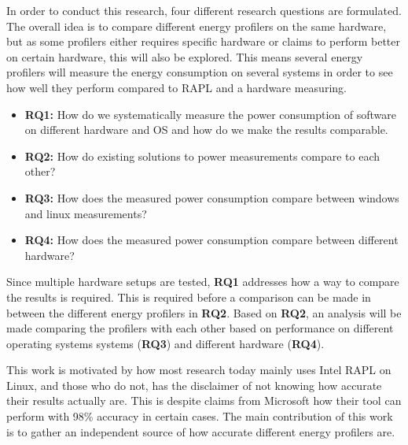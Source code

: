 In order to conduct this research, four different research questions are formulated. The overall idea is to compare different energy profilers on the same hardware, but as some profilers either requires specific hardware or claims to perform better on certain hardware, this will also be explored. This means several energy profilers will measure the energy consumption on several systems in order to see how well they perform compared to RAPL and a hardware measuring.


\begin{itemize}
    \item \textbf{RQ1:} How do we systematically measure the power consumption of software on different hardware and OS and how do we make the results comparable.
    \item \textbf{RQ2:} How do existing solutions to power measurements compare to each other?
    \item \textbf{RQ3:} How does the measured power consumption compare between windows and linux measurements?
    \item \textbf{RQ4:} How does the measured power consumption compare between different hardware?
\end{itemize}

Since multiple hardware setups are tested, \textbf{RQ1} addresses how a way to compare the results is required. This is required before a comparison can be made in between the different energy profilers in \textbf{RQ2}. Based on \textbf{RQ2}, an analysis will be made comparing the profilers with each other based on performance on different operating systems systems (\textbf{RQ3}) and different hardware (\textbf{RQ4}).

This work is motivated by how most research today mainly uses Intel RAPL on Linux\cite*[]{Rasmussen2021,Pereira2017,Theilmann2022,Lindholt2022}, and those who do not, has the disclaimer of not knowing how accurate their results actually are\cite[]{Bruce2015ReducingEC, Ozturk2019, Unlu2021}. This is despite claims from Microsoft how their tool can perform with 98\% accuracy in certain cases\cite[]{E3WinHec}. The main contribution of this work is to gather an independent source of how accurate different energy profilers are.





